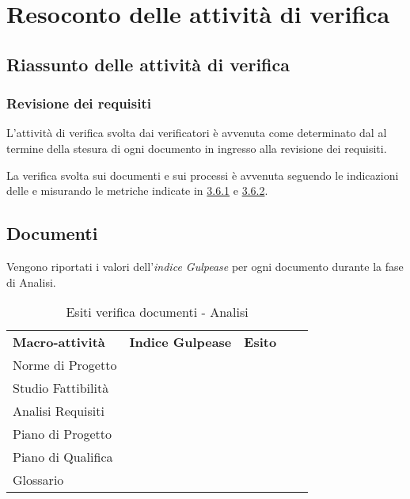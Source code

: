 \newpage
\section{Resoconto delle attività di verifica} \label{App:AppendixA}
	\subsection{Riassunto delle attività di verifica} \label{App:AppendixA}
		\subsubsection{Revisione dei requisiti} \label{App:AppendixA}
			
			L'attività di verifica svolta dai verificatori è avvenuta come determinato dal \PianoDiProgetto al termine della stesura di ogni documento in ingresso alla revisione dei requisiti.
			
			La verifica svolta sui documenti e sui processi è avvenuta seguendo le indicazioni delle \NormeDiProgetto e misurando le metriche indicate in \hyperlink{metriche_documenti}{3.6.1} e \hyperlink{metriche_processi}{3.6.2}.
\subsection{Documenti} \label{App:AppendixB}
	
		Vengono riportati i valori dell’\textit{indice Gulpease} per ogni documento durante la fase di Analisi. 
		
		\begin{table}[!ht]
			\centering
				\begin{tabular}{|l|l|l|ll}
					\cline{1-3}
					 \textbf{Macro-attività}  & \textbf{Indice Gulpease}  & \textbf{Esito}  &  \\ \cline{1-3}
					 Norme di Progetto  &  &  &  \\ \cline{1-3}
					 Studio Fattibilità &  &  &  \\ \cline{1-3}
					 Analisi Requisiti &  &  &  \\ \cline{1-3}
					 Piano di Progetto &  &  &  \\ \cline{1-3}
					 Piano di Qualifica &  &  &  \\ \cline{1-3}
					 Glossario &  &  &  \\ \cline{1-3}
				\end{tabular}
				\caption{Esiti verifica documenti - Analisi}
		\end{table}
